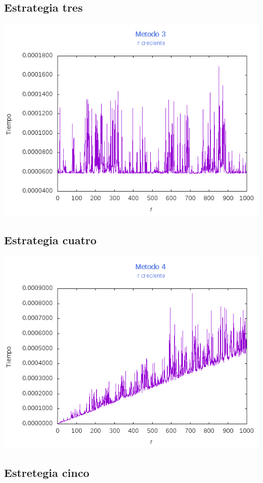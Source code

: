 \documentclass[12pt,letterpaper]{scrartcl}
\begin{document}
\subsection{Estrategia tres}

\includegraphics[scale=1]{Metodo3/plot1m3}

\subsection{Estrategia cuatro}

\includegraphics[scale=1]{Metodo4/plot1m4}

\subsection{Estretegia cinco}
\end{document}
